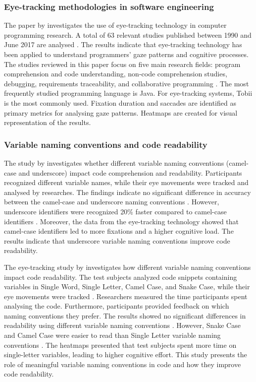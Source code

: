 \subsubsection{Eye-tracking methodologies in software engineering}
The paper by \citet{obaidellah2018survey} investigates the use of eye-tracking technology in computer programming research. A total of 63 relevant studies published between 1990 and June 2017 are analysed \cite{obaidellah2018survey}. The results indicate that eye-tracking technology has been applied to understand programmers' gaze patterns and cognitive processes. The studies reviewed in this paper focus on five main research fields: program comprehension and code understanding, non-code comprehension studies, debugging, requirements traceability, and collaborative programming \cite{obaidellah2018survey}.  The most frequently studied programming language is Java.  
For eye-tracking systems, Tobii is the most commonly used.  Fixation duration and saccades are identified as primary metrics for analysing gaze patterns. Heatmaps are created for visual representation of the results.


\subsubsection{Variable naming conventions and code readability}

The study by \citet{sharif2010eye} investigates whether different variable naming conventions (camel-case and underscore) impact code comprehension and readability.
Participants recognized different variable names, while their eye movements were tracked and analysed by researches. 
The findings indicate no significant difference in accuracy between the camel-case and underscore naming conventions \cite{sharif2010eye}. However, underscore identifiers were recognized 20\% faster compared to camel-case identifiers \cite{sharif2010eye}. Moreover, the data from the eye-tracking technology showed that camel-case identifiers led to more fixations and a higher cognitive load.    
The results indicate that underscore variable naming conventions improve code readability.   


The eye-tracking study by \citet{broberg2019using} investigates how different variable naming conventions impact code readability.  
The test subjects analyzed code snippets containing variables in Single Word, Single Letter, Camel Case, and Snake Case, while  their eye movements were tracked \cite{broberg2019using}. Researchers measured the time participants spent analysing the code. Furthermore, participants provided feedback on which naming conventions they prefer. The results showed no significant differences in readability using different variable naming conventions \cite{broberg2019using}. However, Snake Case and Camel Case were easier to read than Single Letter variable naming conventions \cite{broberg2019using}. The heatmaps presented that test subjects spent more time on single-letter variables, leading to higher cognitive effort. This study presents the role of meaningful variable naming conventions in code and how they improve code readability.   

